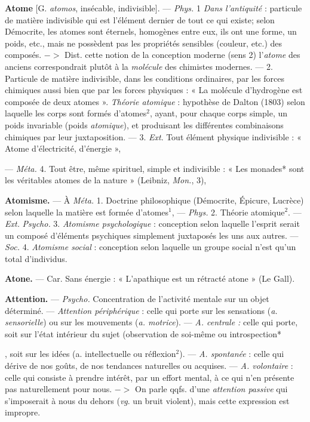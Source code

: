 \begin{itemize}[leftmargin=1cm, label=, itemsep=1pt]
{{{\item {\bf Atome} [G. {\it atomos}, insécable, indivisible]. — \textsf{\textit {Phys.}} 1 {\it Dans l'antiquité} :
particule de matière indivisible qui
est l'élément dernier de tout ce qui
existe; selon Démocrite, les atomes
sont éternels, homogènes entre eux,
ils ont une forme, un poids, etc.,
mais ne possèdent pas les propriétés
sensibles (couleur, etc.) des composés. $->$ Dist. cette notion de la
conception moderne (sens 2)
l'{\it atome} des anciens correspondrait
plutôt à la {\it molécule} des chimistes
modernes. — 2. Particule de matière
indivisible, dans les conditions ordinaires, par les forces chimiques
aussi bien que par les forces physiques : « La molécule d'hydrogène
est composée de deux atomes ».
{\it Théorie atomique} : hypothèse de
Dalton (1803) selon laquelle les
corps sont formés d’atomes$^2$, ayant,
pour chaque corps simple, un poids
invariable (poids {\it atomique}), et produisant les différentes combinaisons
chimiques par leur juxtaposition. —
3. {\it Ext}. Tout élément physique indivisible : « Atome d'électricité,
d'énergie »,

— \textsf{\textit {Méta.}} 4. Tout être, même spirituel, simple et indivisible : « Les
monades* sont les véritables atomes
de la nature » (Leibniz, {\it Mon.}, 3),

\item {\bf Atomisme.} — À \textsf{\textit {Méta.}} 1. Doctrine philosophique (Démocrite, Épicure,
Lucrèce) selon laquelle la matière est
formée d’atomes$^1$, — \textsf{\textit {Phys.}} 2. Théorie
atomique$^2$. — {\it Ext.} \textsf{\textit {Psycho.}} 3. {\it Atomisme psychologique} : conception
selon laquelle l'esprit serait un
composé d'éléments psychiques
simplement juxtaposés les uns aux
autres. — \textsf{\textit {Soc.}} 4. {\it Atomisme social} :
conception selon laquelle un groupe
social n’est qu'un total d'individus.

\item {\bf Atone.} — Car. Sans énergie : « L'apathique est un rétracté atone »
(Le Gall).

\item {\bf Attention.} — \textsf{\textit {Psycho.}} Concentration
de l’activité mentale sur un objet
déterminé. — {\it Attention périphérique} : celle qui porte sur les sensations
({\it a. sensorielle}) ou sur les mouvements ({\it a. motrice}). — {\it A. centrale :}
celle qui porte, soit sur l'état intérieur du sujet (observation de
soi-même ou introspection*}, soit sur les
idées (a. intellectuelle ou réflexion$^2$).
— {\it A. spontanée} : celle qui dérive de
nos goûts, de nos tendances naturelles ou acquises. — {\it A. volontaire} :
celle qui consiste à prendre intérêt,
par un effort mental, à ce qui n’en
présente pas naturellement pour
nous. $->$ On parle qqfs. d’une
{\it attention passive} qui s'imposerait à
nous du dehors ({\it vg}. un bruit violent),
mais cette expression est impropre.

}}
\end{itemize}
